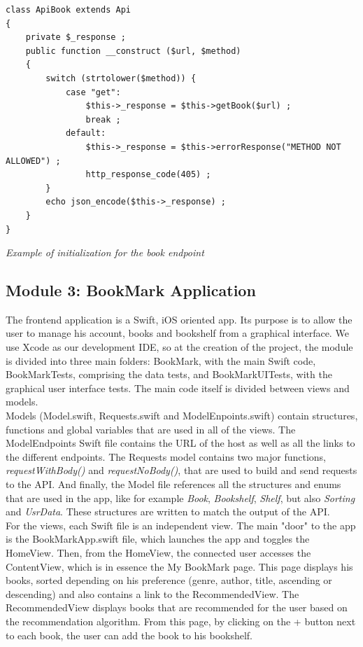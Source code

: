 \documentclass[conference]{IEEEtran}
\begin{document}
\begin{center}
\begin{lstlisting}[language=custom]
class ApiBook extends Api
{
    private $_response ;
    public function __construct ($url, $method)
    {
        switch (strtolower($method)) {
            case "get":
                $this->_response = $this->getBook($url) ;
                break ;
            default:
                $this->_response = $this->errorResponse("METHOD NOT ALLOWED") ;
                http_response_code(405) ;
        }
        echo json_encode($this->_response) ;
    }
}
\end{lstlisting}
\textit{Example of initialization for the book endpoint}
\end{center}

\subsection{Module 3: BookMark Application}

The frontend application is a Swift, iOS oriented app. Its purpose is to allow the user to manage his account, books and bookshelf from a graphical interface. We use Xcode as our development IDE, so at the creation of the project, the module is divided into three main folders: BookMark, with the main Swift code, BookMarkTests, comprising the data tests, and BookMarkUITests, with the graphical user interface tests. The main code itself is divided between views and models.\\

Models (Model.swift, Requests.swift and ModelEnpoints.swift) contain structures, functions and global variables that are used in all of the views. The ModelEndpoints Swift file contains the URL of the host as well as all the links to the different endpoints. The Requests model contains two major functions, \textit{requestWithBody()} and \textit{requestNoBody()}, that are used to build and send requests to the API. And finally, the Model file references all the structures and enums that are used in the app, like for example \textit{Book}, \textit{Bookshelf}, \textit{Shelf}, but also \textit{Sorting} and \textit{UsrData}. These structures are written to match the output of the API.\\
For the views, each Swift file is an independent view. The main "door" to the app is the BookMarkApp.swift file, which launches the app and toggles the HomeView. Then, from the HomeView, the connected user accesses the ContentView, which is in essence the My BookMark page. This page displays his books, sorted depending on his preference (genre, author, title, ascending or descending) and also contains a link to the RecommendedView. The RecommendedView displays books that are recommended for the user based on the recommendation algorithm. From this page, by clicking on the + button next to each book, the user can add the book to his bookshelf.\\
\end{document}
